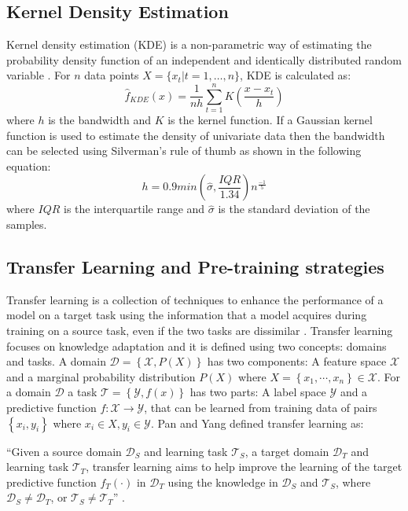 \subsection{Kernel Density Estimation}\label{sec:KDE}
Kernel density estimation (KDE) is a non-parametric way of estimating the probability density function of an independent and identically distributed random variable \cite{Parzen1962,Rosenblatt1956}. For \( n\)  data points \( X = \{ x_{t}\vert t = 1,\ldots ,n\}\), KDE is calculated as:
\begin{equation}
	\hat{f}_{KDE}\left(x\right) = \frac{1}{nh}\sum_{t = 1}^{n}K\left(\frac{x-x_{t}}{h}\right)
\end{equation}
where \( h\) is the bandwidth and \( K\) is the kernel function. If a Gaussian kernel function is used to estimate the density of univariate data then the bandwidth can be selected using Silverman’s rule of thumb \cite{Silverman2018} as shown in the following equation:
\begin{equation}
	h=0.9 min\left (\hat{\sigma},\frac{IQR}{1.34}\right)n^{\frac{-1}{5}}
\end{equation}
where \( IQR\) is the interquartile range and \(\hat{\sigma }\) is the standard deviation of the samples.


\subsection{Transfer Learning and Pre-training strategies}\label{sec:TL}
Transfer learning is a collection of techniques to enhance the performance of a model on a target task using the information that a model acquires during training on a source task, even if the two tasks are dissimilar \cite{5288526}. Transfer learning focuses on knowledge adaptation and it is defined using two concepts: domains and tasks. A domain $\mathcal{D}=\left \{ \mathcal{X},P(X) \right \}$ has two components: A feature space $\mathcal{X}$ and a marginal probability distribution $P(X)$ where $X=\left \{ x_{1},\cdots ,x_{n} \right \} \in \mathcal{X}$. For a domain $\mathcal{D}$ a task $\mathcal{T}=\left \{ \mathcal{Y},f(x) \right \}$ has two parts: A label space $\mathcal{Y}$ and a predictive function $f:\mathcal{X}\rightarrow\mathcal{Y}$, that can be learned from training data of pairs $\left \{ x_{i},y_{i} \right \}$ where $ x_{i} \in X, y_{i} \in \mathcal{Y}$. Pan and Yang \cite{5288526} defined transfer learning as:
\begin{definition}
	\enquote{Given a source domain $\mathcal{D}_S$ and learning task $\mathcal{T}_S$, a target domain $\mathcal{D}_T$ and learning task  $\mathcal{T}_T$, transfer learning aims to help improve the learning of the target predictive function $f_T(\cdot)$ in  $\mathcal{D}_T$ using the knowledge in  $\mathcal{D}_S$ and  $\mathcal{T}_S$, where $\mathcal{D}_S \neq \mathcal{D}_T$, or $\mathcal{T}_S \neq \mathcal{T}_T$} \cite{5288526}.
\end{definition}

